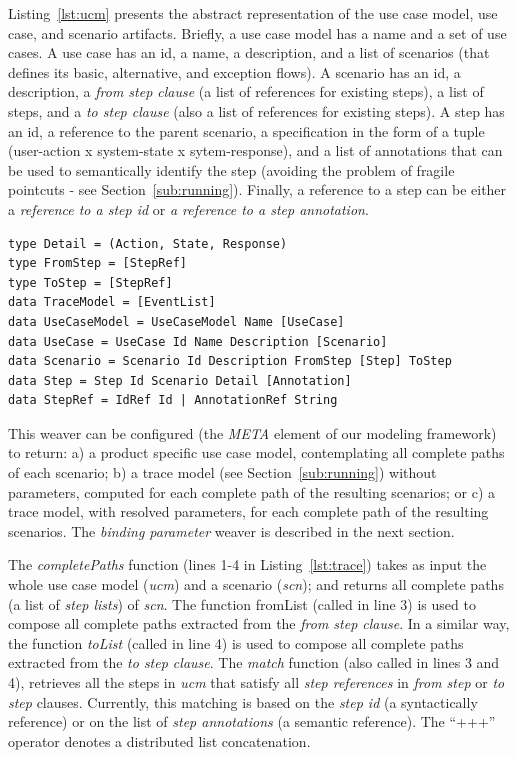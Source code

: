 Listing~\ref{lst:ucm} presents the abstract representation of the
use case model, use case, and scenario artifacts. Briefly, a use
case model has a name and a set of use cases. A use case has an id,
a name, a description, and a list of scenarios (that defines its
basic, alternative, and exception flows). A scenario has an id, a
description, a \emph{from step clause} (a list of references for
existing steps), a list of steps, and a \emph{to step clause} (also
a list of references for existing steps). A step has an id, a
reference to the parent scenario, a specification in the form of a tuple
(user-action x system-state x sytem-response), and a list of annotations
that can be used to semantically identify the step (avoiding
the problem of fragile pointcuts - see Section~\ref{sub:running}).
Finally, a reference to a step can be either a \emph{reference to a
step id} or \emph{a reference to a step annotation}.

\begin{lstlisting}[belowskip=10pt,frame=tb,caption={Use Case and Scenario representation},label=lst:ucm]
type Detail = (Action, State, Response)
type FromStep = [StepRef]
type ToStep = [StepRef]
data TraceModel = [EventList]
data UseCaseModel = UseCaseModel Name [UseCase]
data UseCase = UseCase Id Name Description [Scenario]
data Scenario = Scenario Id Description FromStep [Step] ToStep
data Step = Step Id Scenario Detail [Annotation]
data StepRef = IdRef Id | AnnotationRef String
\end{lstlisting}

This weaver can be configured (the \emph{META} element of
our modeling framework) to return: a) a product specific use case
model, contemplating all complete paths of each scenario; b) a trace
model (see Section~\ref{sub:running}) without parameters, computed
for each complete path of the resulting scenarios; or c) a trace model,
with resolved parameters, for each complete path of the resulting
scenarios. The \emph{binding parameter} weaver is described
in the next section.

The \emph{completePaths} function (lines 1-4 in Listing~\ref{lst:trace}) 
takes as input the whole use case model (\emph{ucm}) and a scenario (\emph{scn});
and returns all complete paths (a list of \emph{step lists}) of
\emph{scn}. The function fromList (called in line 3) is used to
compose all complete paths extracted from the \emph{from step
clause}. In a similar way, the function \emph{toList} (called in
line 4) is used to compose all complete paths extracted from the
\emph{to step clause}. The \emph{match} function (also called in
lines 3 and 4), retrieves all the steps in \emph{ucm} that satisfy all 
\emph{step references} in \emph{from step} or \emph{to step}
clauses. Currently, this matching is based on the \emph{step id} (a
syntactically reference) or on the list of \emph{step annotations}
(a semantic reference). The ``+++'' operator denotes a distributed
list concatenation.

